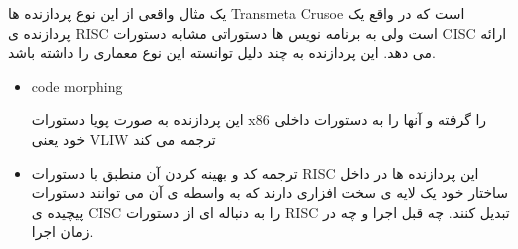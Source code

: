 یک مثال واقعی از این نوع پردازنده ها
Transmeta Crusoe
است که در واقع یک پردازنده ی
RISC
است ولی به برنامه نویس ها دستوراتی مشابه دستورات
CISC
ارائه می دهد.
\newline
این پردازنده به چند دلیل توانسته این نوع معماری را داشته باشد. 
\begin{itemize}
  \item {\begin{LTR} code morphing \end{LTR}}
  این پردازنده به صورت پویا دستورات
  x86
  را گرفته و آنها را به دستورات داخلی خود یعنی
  VLIW
  ترجمه می کند
    \newline
  \item ترجمه کد و بهینه کردن آن منطبق با دستورات RISC
  \newline
  این پردازنده ها در داخل ساختار خود یک لایه ی سخت افزاری دارند که به واسطه ی آن
  می توانند دستورات پیچیده ی 
  CISC
  را به دنباله ای از دستورات
  RISC
  تبدیل کنند. چه قبل اجرا و چه در زمان اجرا.
\end{itemize}